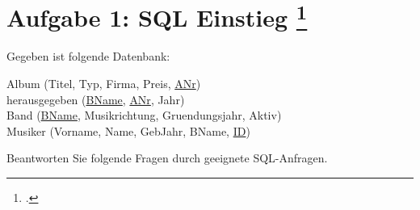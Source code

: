 \documentclass{lehramt-informatik-aufgabe}
\begin{document}

\section{Aufgabe 1: SQL Einstieg
\footcite{db:pu:2}}

Gegeben ist folgende Datenbank: \bigskip

{
\ttfamily
\noindent
Album (Titel, Typ, Firma, Preis, \underline{ANr})\\
\noindent
herausgegeben (\underline{BName}, \underline{ANr}, Jahr)\\
\noindent
Band (\underline{BName}, Musikrichtung, Gruendungsjahr, Aktiv)\\
\noindent
Musiker (Vorname, Name, GebJahr, BName, \underline{ID})\\
}

\noindent
Beantworten Sie folgende Fragen durch geeignete SQL-Anfragen.
\end{document}
